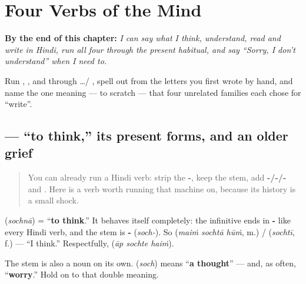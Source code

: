 
\chapter{Four Verbs of the Mind}
\label{ch:hi-verbs-of-the-mind}

\begin{chapteropening}
\textbf{By the end of this chapter:} \emph{I can say what I think, understand, read and write in Hindi, run all four through the present habitual, and say \textquotedblleft{}Sorry, I don't understand\textquotedblright{} when I need to.}

Run , ,  and  through  …/ , spell out   from the letters you first wrote by hand, and name the one meaning — to scratch — that four unrelated families each chose for \textquotedblleft{}write\textquotedblright{}.
\end{chapteropening}

\section[\texorpdfstring{\hi{सोचना} / \hi{सोच} … (sochnā / soch …)}{सोचना / सोच … (sochnā / soch …)}]{ — \textquotedblleft{}to think,\textquotedblright{} its present forms, and an older grief}

\label{lesson:HI-C34-sochna}



\begin{quote}
You can already run a Hindi verb: strip the \textbf{-}, keep the stem, add \textbf{-/-/-} and \textbf{}. Here is a verb worth running that machine on, because its history is a small shock.
\end{quote}

\begin{cousinweb}
\textbf{} (\emph{sochnā}) = \textquotedblleft{}\textbf{to think}.\textquotedblright{} It behaves itself completely: the infinitive ends in \textbf{-} like every Hindi verb, and the stem is \textbf{-} (\emph{soch-}). So \textbf{  } (\emph{maiṁ sochtā hūṁ}, m.) / \textbf{  } (\emph{sochtī}, f.) — \textquotedblleft{}I think.\textquotedblright{} Respectfully, \textbf{  } (\emph{āp sochte haiṁ}).

The stem is also a noun on its own. \textbf{} (\emph{soch}) means \textquotedblleft{}\textbf{a thought}\textquotedblright{} — and, as often, \textquotedblleft{}\textbf{worry}.\textquotedblright{} Hold on to that double meaning.
\end{cousinweb}

